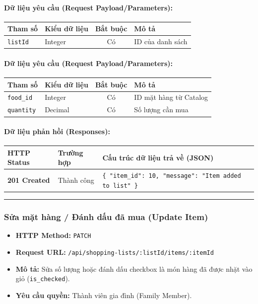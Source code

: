 \documentclass[12pt,a4paper]{article}
\begin{document}
\paragraph{Dữ liệu yêu cầu (Request Payload/Parameters):}
\begin{longtable}{|p{2.8cm}|p{2.2cm}|c|p{7.0cm}|}
\hline
\textbf{Tham số} & \textbf{Kiểu dữ liệu} & \textbf{Bắt buộc} & \textbf{Mô tả} \\ \hline
\endhead
\texttt{listId} & Integer & Có & ID của danh sách \\ \hline
\end{longtable}

\paragraph{Dữ liệu yêu cầu (Request Payload/Parameters):}
\begin{longtable}{|p{2.8cm}|p{2.2cm}|c|p{7.0cm}|}
\hline
\textbf{Tham số} & \textbf{Kiểu dữ liệu} & \textbf{Bắt buộc} & \textbf{Mô tả} \\ \hline
\endhead
\texttt{food\_id} & Integer & Có & ID mặt hàng từ Catalog \\ \hline
\texttt{quantity} & Decimal & Có & Số lượng cần mua \\ \hline
\end{longtable}

\paragraph{Dữ liệu phản hồi (Responses):}
\begin{longtable}{|p{2.8cm}|p{3.2cm}|p{8.0cm}|}
\hline
\textbf{HTTP Status} & \textbf{Trường hợp} & \textbf{Cấu trúc dữ liệu trả về (JSON)} \\ \hline
\endhead
\textbf{201 Created} & Thành công & \texttt{\{ "item\_id": 10, "message": "Item added to list" \}} \\ \hline
\end{longtable}

\vskip 0.4cm
\noindent\rule{\textwidth}{0.3pt}
\vskip 0.4cm

\subsubsection{Sửa mặt hàng / Đánh dấu đã mua (Update Item)}
\begin{itemize}[leftmargin=*]
    \item \textbf{HTTP Method:} \texttt{PATCH}
    \item \textbf{Request URL:} \texttt{/api/shopping-lists/:listId/items/:itemId}
    \item \textbf{Mô tả:} Sửa số lượng hoặc đánh dấu checkbox là món hàng đã được nhặt vào giỏ (\texttt{is\_checked}).
    \item \textbf{Yêu cầu quyền:} Thành viên gia đình (Family Member).
\end{itemize}
\end{document}
